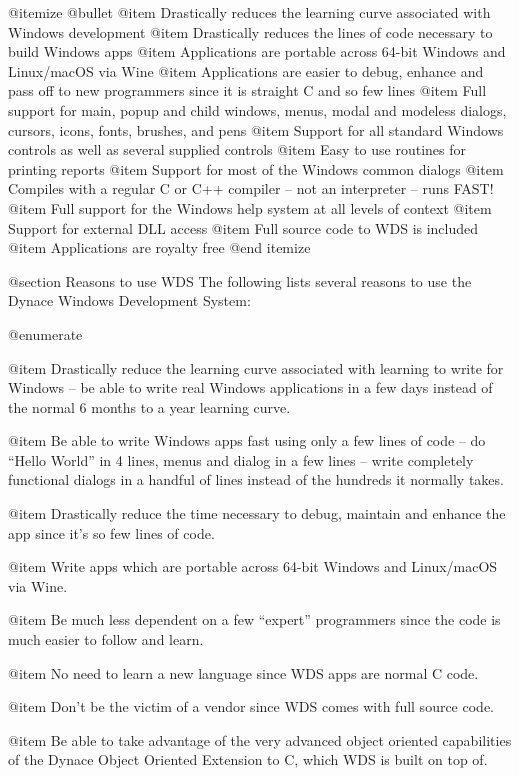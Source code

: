 @itemize @bullet
@item Drastically reduces the learning curve associated with Windows
development
@item Drastically reduces the lines of code necessary to build Windows apps
@item Applications are portable across 64-bit Windows and Linux/macOS via Wine
@item Applications are easier to debug, enhance and pass off to new programmers
since it is straight C and so few lines
@item Full support for main, popup and child windows, menus,
modal and modeless dialogs, cursors, icons, fonts, brushes, and pens
@item Support for all standard Windows controls as well as several supplied controls
@item Easy to use routines for printing reports
@item Support for most of the Windows common dialogs
@item Compiles with a regular C or C++ compiler -- not an interpreter -- 
runs FAST!
@item Full support for the Windows help system at all levels of context
@item Support for external DLL access
@item Full source code to WDS is included
@item Applications are royalty free
@end itemize

@section Reasons to use WDS
The following lists several reasons to use the Dynace Windows
Development System:

@enumerate

@item
Drastically reduce the learning curve associated with learning to
write for Windows -- be able to write real Windows applications in
a few days instead of the normal 6 months to a year learning curve.

@item
Be able to write Windows apps fast using only a few lines of code --
do ``Hello World'' in 4 lines, menus and dialog in a few lines -- write
completely functional dialogs in a handful of lines instead of the
hundreds it normally takes.

@item
Drastically reduce the time necessary to debug, maintain and enhance the
app since it's so few lines of code.

@item
Write apps which are portable across 64-bit Windows and Linux/macOS
via Wine.

@item
Be much less dependent on a few ``expert'' programmers since the code
is much easier to follow and learn.

@item
No need to learn a new language since WDS apps are normal C code.

@item
Don't be the victim of a vendor since WDS comes with full source code.

@item
Be able to take advantage of the very advanced object oriented
capabilities of the Dynace Object Oriented Extension to C, which
WDS is built on top of.

